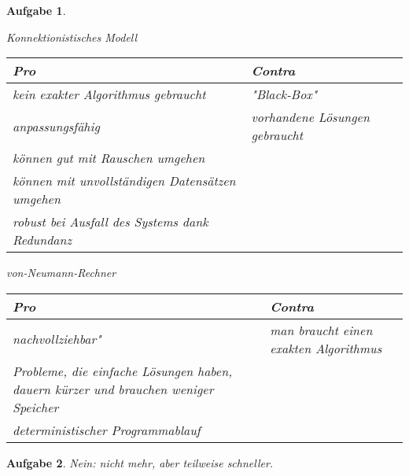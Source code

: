 \documentclass[11pt]{article}
\theoremstyle{break}
\newtheorem{task}{Aufgabe}
\begin{document}
\begin{task}
    \begin{minipage}[t]{0.5\textwidth}
        \begin{center}
            Konnektionistisches Modell\vspace{3mm}\\
            \begin{tabularx}{\textwidth}{X|X}
                Pro & Contra\\\hline
                kein exakter Algorithmus gebraucht & "Black-Box"\\\hline
                anpassungsfähig & vorhandene Lösungen gebraucht\\\hline
                können gut mit Rauschen umgehen & \\\hline
                können mit unvollständigen Datensätzen umgehen & \\\hline
                robust bei Ausfall des Systems dank Redundanz
            \end{tabularx}
        \end{center}
    \end{minipage}
    \begin{minipage}[t]{0.5\textwidth}
        \begin{center}
            von-Neumann-Rechner\vspace{3mm}\\
            \begin{tabularx}{\textwidth}{X|X}
                Pro & Contra\\\hline
                nachvollziehbar" & man braucht einen exakten Algorithmus\\\hline
                Probleme, die einfache Lösungen haben, dauern kürzer und brauchen weniger Speicher & \\\hline
                deterministischer Programmablauf & \\\hline
            \end{tabularx}
        \end{center}
    \end{minipage}
\end{task}
\begin{task}
    Nein: nicht mehr, aber teilweise schneller.
\end{task}
\end{document}
